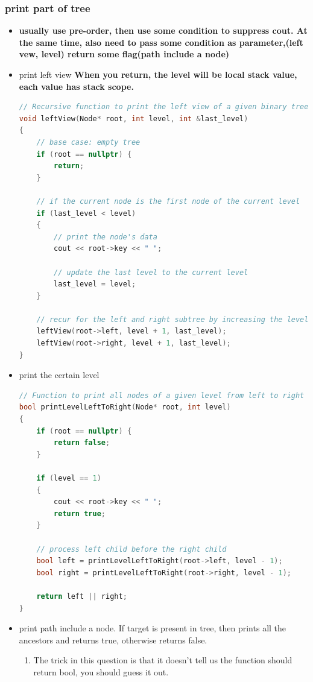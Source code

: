 \documentclass[a4paper,11pt,twoside]{book}
\begin{document}
\subsubsection{print part of tree}
\begin{itemize}
	\item \textbf{usually use pre-order, then use some condition to suppress cout. At the same time, also need to pass some condition as parameter,(left vew, level) return some flag(path include a node)}
	
	\item print left view \textbf{When you return, the level will be local stack value, each value has stack scope.}

\begin{lstlisting}[frame=single, language=c++]
// Recursive function to print the left view of a given binary tree
void leftView(Node* root, int level, int &last_level)
{
	// base case: empty tree
	if (root == nullptr) {
		return;
	}
	
	// if the current node is the first node of the current level
	if (last_level < level)
	{
		// print the node's data
		cout << root->key << " ";
		
		// update the last level to the current level
		last_level = level;
	}
	
	// recur for the left and right subtree by increasing the level by 1
	leftView(root->left, level + 1, last_level);
	leftView(root->right, level + 1, last_level);
}	
\end{lstlisting}	

	\item print the certain level
\begin{lstlisting}[frame=single, language=c++]
// Function to print all nodes of a given level from left to right
bool printLevelLeftToRight(Node* root, int level)
{
	if (root == nullptr) {
		return false;
	}
	
	if (level == 1)
	{
		cout << root->key << " ";
		return true;
	}
	
	// process left child before the right child
	bool left = printLevelLeftToRight(root->left, level - 1);
	bool right = printLevelLeftToRight(root->right, level - 1);
	
	return left || right;
}
\end{lstlisting}

	\item print path include a node. If target is present in tree, then prints all the ancestors and returns true, otherwise returns false. 
\begin{enumerate}
	\item The trick in this question is that it doesn't tell us the function should return bool, you should guess it out.
	

\end{enumerate}
\end{itemize}
\end{document}
